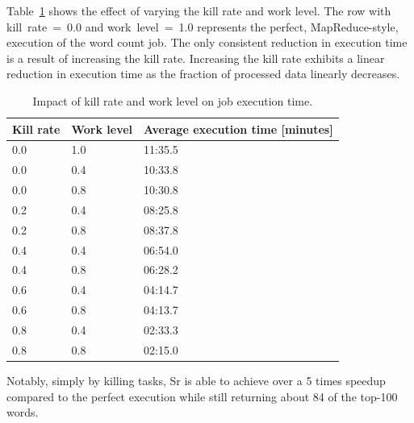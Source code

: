 \documentclass[12pt]{article}
\begin{document}
Table~\ref{table:runtime} shows the effect of varying the kill rate and work level. The row
with kill~rate~=~0.0 and work~level~=~1.0 represents the perfect, MapReduce-style, execution
of the word count job. The only consistent reduction in execution time is a result of
increasing the kill rate. Increasing the kill rate exhibits a linear reduction in execution
time as the fraction of processed data linearly decreases.

\begin{table}
\begin{tabularx}{\linewidth}{|X|X|X|}
\hline
Kill rate & Work level & Average execution time [minutes] \\ \hline
0.0 & 1.0 & 11:35.5 \\ \hline
0.0 & 0.4 & 10:33.8 \\ \hline
0.0 & 0.8 & 10:30.8 \\ \hline
0.2 & 0.4 & 08:25.8 \\ \hline
0.2 & 0.8 & 08:37.8 \\ \hline
0.4 & 0.4 & 06:54.0 \\ \hline
0.4 & 0.8 & 06:28.2 \\ \hline
0.6 & 0.4 & 04:14.7 \\ \hline
0.6 & 0.8 & 04:13.7 \\ \hline
0.8 & 0.4 & 02:33.3 \\ \hline
0.8 & 0.8 & 02:15.0 \\ \hline
\end{tabularx}
\caption{Impact of kill rate and work level on job execution time.}
\label{table:runtime}
\end{table}

Notably, simply by killing tasks, Sr is able to achieve over a 5 times speedup compared
to the perfect execution while still returning about 84 of the top-100 words.
\end{document}
